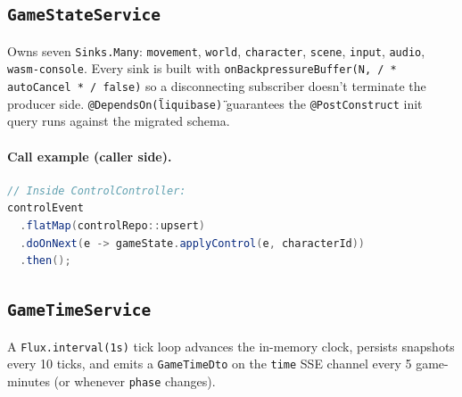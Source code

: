 \subsection{\texttt{GameStateService}}
Owns seven \texttt{Sinks.Many}: \texttt{movement}, \texttt{world},
\texttt{character}, \texttt{scene}, \texttt{input}, \texttt{audio},
\texttt{wasm-console}. Every sink is built with
\texttt{onBackpressureBuffer(N, /\,*\,autoCancel\,*\,/ false)} so a
disconnecting subscriber doesn't terminate the producer side.
\texttt{@DependsOn(\"liquibase\")} guarantees the \texttt{@PostConstruct}
init query runs against the migrated schema.


\paragraph{Call example (caller side).}
\begin{lstlisting}[language=java]
// Inside ControlController:
controlEvent
  .flatMap(controlRepo::upsert)
  .doOnNext(e -> gameState.applyControl(e, characterId))
  .then();
\end{lstlisting}

\subsection{\texttt{GameTimeService}}
A \texttt{Flux.interval(1s)} tick loop advances the in-memory clock,
persists snapshots every 10 ticks, and emits a \texttt{GameTimeDto} on
the \texttt{time} SSE channel every 5 game-minutes (or whenever
\texttt{phase} changes).


